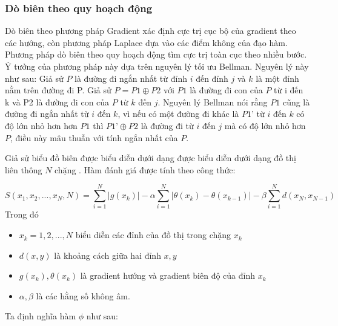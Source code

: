 \documentclass[12pt, oneside, a4]{book}
\begin{document}
\subsubsection{Dò biên theo quy hoạch động}
Dò biên theo phương pháp Gradient xác định cực trị cục bộ của gradient theo các hướng, còn phương pháp Laplace dựa vào các điểm không của đạo hàm. Phương pháp dò biên theo quy hoạch động tìm cực trị toàn cục theo nhiều bước. Ý tưởng của phương pháp này dựa trên nguyên lý tối ưu Bellman. Nguyên lý này như sau:
Giả sử $P$ là đường đi ngắn nhất từ đỉnh $i$ đến đỉnh $j$ và $k$ là một đỉnh nằm trên đường đi P. Giả sử $P=P1\oplus P2$ với $P1$ là đường đi con của $P$ từ i đến k và P2 là đường đi con của $P$ từ $k$ đến $j$. Nguyên lý Bellman nói rằng $P1$ cũng là đường đi ngắn nhất từ $i$ đến $k$, vì nếu có một đường đi khác là $P1’$ từ $i$ đến $k$ có độ lớn nhỏ hơn hơn $P1$ thì $P1’\oplus P2$ là đường đi từ $i$ đến $j$ mà có độ lớn nhỏ hơn $P$, điều này mâu thuẫn với tính ngắn nhất của $P$.

Giả sử biểu đồ biên được biểu diễn dưới dạng được biểu diễn dưới dạng đồ thị liên thông $N$ chặng . Hàm đánh giá được tính theo công thức:

\begin{equation*}
S(x_1,x_2,...,x_N,N)=\sum_{i=1}^{N}|g(x_k)|-\alpha \sum_{i=1}^{N}|\theta(x_k)-\theta(x_{k-1})|-\beta \sum_{i=1}^{N}d(x_N,x_{N-1})
\end{equation*}
Trong đó 
\begin{itemize}
\item $x_k=1,2,..., N$ biểu diễn các đỉnh của đồ thị trong chặng $x_k$
\item $d(x,y)$ là khoảng cách giữa hai đỉnh $x, y$ 
\item $g(x_k), \theta(x_k)$ là gradient hướng và gradient biên độ của đỉnh $x_k$
\item $\alpha ,\beta$ là các hằng số không âm. 
\end{itemize}
Ta định nghĩa hàm $\phi$ như sau:
\end{document}
